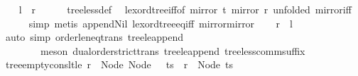 \begin{isabellebody}
%
\isadelimproof
%
\endisadelimproof
%
\isatagproof
{}\isamarkupfalse%
\isanewline
\ \ \isamarkupfalse%
\ {\isachardoublequoteopen}{\isacharquery}{\kern0pt}l\ {\isasymLongrightarrow}\ {\isacharquery}{\kern0pt}r{\isachardoublequoteclose}\isanewline
\ \ \ \ \isamarkupfalse%
\ tree{\isacharunderscore}{\kern0pt}less{\isacharunderscore}{\kern0pt}def\ \isamarkupfalse%
\ lexord{\isacharunderscore}{\kern0pt}tree{\isacharunderscore}{\kern0pt}iff{\isacharbrackleft}{\kern0pt}of\ {\isachardoublequoteopen}mirror\ t{\isachardoublequoteclose}\ {\isachardoublequoteopen}mirror\ r{\isachardoublequoteclose}{\isacharcomma}{\kern0pt}\ unfolded\ mirror{\isacharunderscore}{\kern0pt}iff{\isacharbrackright}{\kern0pt}\ \isanewline
\ \ \ \ \isamarkupfalse%
\ {\isacharparenleft}{\kern0pt}simp{\isacharcomma}{\kern0pt}\ metis\ append{\isacharunderscore}{\kern0pt}Nil\ lexord{\isacharunderscore}{\kern0pt}tree{\isacharunderscore}{\kern0pt}eq{\isacharunderscore}{\kern0pt}iff\ mirror{\isacharunderscore}{\kern0pt}mirror{\isacharparenright}{\kern0pt}\isanewline
{}\isamarkupfalse%
\isanewline
\ \ \isamarkupfalse%
\ {\isachardoublequoteopen}{\isacharquery}{\kern0pt}r\ {\isasymLongrightarrow}\ {\isacharquery}{\kern0pt}l{\isachardoublequoteclose}\isanewline
\ \ \ \ \isamarkupfalse%
\ {\isacharparenleft}{\kern0pt}auto\ simp{\isacharcolon}{\kern0pt}\ order{\isacharunderscore}{\kern0pt}le{\isacharunderscore}{\kern0pt}neq{\isacharunderscore}{\kern0pt}trans\ tree{\isacharunderscore}{\kern0pt}le{\isacharunderscore}{\kern0pt}append{\isacharcomma}{\kern0pt}\isanewline
\ \ \ \ \ \ \ \ meson\ dual{\isacharunderscore}{\kern0pt}order{\isachardot}{\kern0pt}strict{\isacharunderscore}{\kern0pt}trans{}\ tree{\isacharunderscore}{\kern0pt}le{\isacharunderscore}{\kern0pt}append\ tree{\isacharunderscore}{\kern0pt}less{\isacharunderscore}{\kern0pt}comm{\isacharunderscore}{\kern0pt}suffix{}{\isacharparenright}{\kern0pt}\isanewline
{}\isamarkupfalse%
%
\endisatagproof
{\isafoldproof}%
%
\isadelimproof
\ \ \isanewline
%
\endisadelimproof
\isanewline
{}\isamarkupfalse%
\ tree{\isacharunderscore}{\kern0pt}empty{\isacharunderscore}{\kern0pt}cons{\isacharunderscore}{\kern0pt}lt{\isacharunderscore}{\kern0pt}le{\isacharcolon}{\kern0pt}\ {\isachardoublequoteopen}r\ {\isacharless}{\kern0pt}\ Node\ {\isacharparenleft}{\kern0pt}Node\ {\isacharbrackleft}{\kern0pt}{\isacharbrackright}{\kern0pt}\ {\isacharhash}{\kern0pt}\ ts{\isacharparenright}{\kern0pt}\ {\isasymLongrightarrow}\ r\ {\isasymle}\ Node\ ts{\isachardoublequoteclose}\isanewline

\end{isabellebody}
